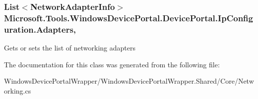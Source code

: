 \subsubsection[{\texorpdfstring{Adapters}{Adapters}}]{\setlength{\rightskip}{0pt plus 5cm}List$<${\bf Network\+Adapter\+Info}$>$ Microsoft.\+Tools.\+Windows\+Device\+Portal.\+Device\+Portal.\+Ip\+Configuration.\+Adapters\hspace{0.3cm}{\ttfamily [get]}, {\ttfamily [set]}}\hypertarget{class_microsoft_1_1_tools_1_1_windows_device_portal_1_1_device_portal_1_1_ip_configuration_a50e7442ff38497a522dc3940b8a1ae3f}{}\label{class_microsoft_1_1_tools_1_1_windows_device_portal_1_1_device_portal_1_1_ip_configuration_a50e7442ff38497a522dc3940b8a1ae3f}


Gets or sets the list of networking adapters 



The documentation for this class was generated from the following file\+:\begin{DoxyCompactItemize}
\item 
Windows\+Device\+Portal\+Wrapper/\+Windows\+Device\+Portal\+Wrapper.\+Shared/\+Core/Networking.\+cs\end{DoxyCompactItemize}

